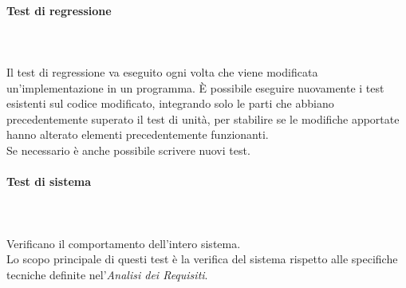 \paragraph*{Test di regressione} \mbox{} \\ \mbox{} \\
Il test di regressione va eseguito ogni volta che viene modificata un'implementazione in un programma. È possibile eseguire nuovamente i test esistenti sul codice modificato, integrando solo le parti che abbiano precedentemente superato il test di unità, per stabilire se le modifiche apportate hanno alterato elementi precedentemente funzionanti.\\ Se necessario è anche possibile scrivere nuovi test.

\paragraph*{Test di sistema} \mbox{} \\ \mbox{} \\
Verificano il comportamento dell'intero sistema.\\
Lo scopo principale di questi test è la verifica del sistema rispetto alle specifiche tecniche definite nel'\textit{Analisi dei Requisiti}.

